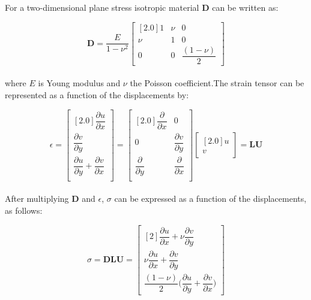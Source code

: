 \documentclass{article}
\begin{document}
For a two-dimensional plane stress isotropic material $\mathbf{D}$ can be written as:

\begin{equation}
	\mathbf{D}
	=
	\frac{E}{1 - \nu^2}
	\begin{bmatrix}[2.0]
		1	 & \nu	 & 0 \\
		\nu	 & 1	 & 0 \\
		0	 & 0	 & \dfrac{(1-\nu)}{2}
	\end{bmatrix}
\end{equation} \\

\noindent where $E$ is Young modulus and $\nu$ the Poisson coefficient.The strain tensor can be represented as a function of the displacements by:

\begin{equation}
	\epsilon
	=
	\begin{bmatrix}[2.0]
		\dfrac{\partial u}{\partial x} \\
		\dfrac{\partial v}{\partial y} \\
		\dfrac{\partial u}{\partial y} + \dfrac{\partial v}{\partial x} \\
	\end{bmatrix}
	=
	\begin{bmatrix}[2.0]
		\dfrac{\partial}{\partial x} & 0 \\
		0 & \dfrac{\partial v}{\partial y} \\
		\dfrac{\partial}{\partial y} & \dfrac{\partial }{\partial x} \\
	\end{bmatrix}
	\begin{bmatrix}[2.0]
		u \\
		v
	\end{bmatrix}
	=
	\mathbf{L} \mathbf{U}
\end{equation} \\

After multiplying $\mathbf{D}$ and $\epsilon$, $\sigma$ can be expressed as a function of the displacements, as follows:

\begin{equation}
	\sigma
	= \mathbf{D} \mathbf{L} \mathbf{U}
	=
	\begin{bmatrix}[2]
		\dfrac{\partial u}{\partial x}
		+ \nu \dfrac{\partial v}{\partial y} \\		
		\nu \dfrac{\partial u}{\partial x}
		+ \dfrac{\partial v}{\partial y} \\		
		\dfrac{(1-\nu)}{2} \bigg(\dfrac{\partial u}{\partial y}
		+ \dfrac{\partial v}{\partial x} \bigg)	
	\end{bmatrix}
\end{equation} \\
\end{document}
